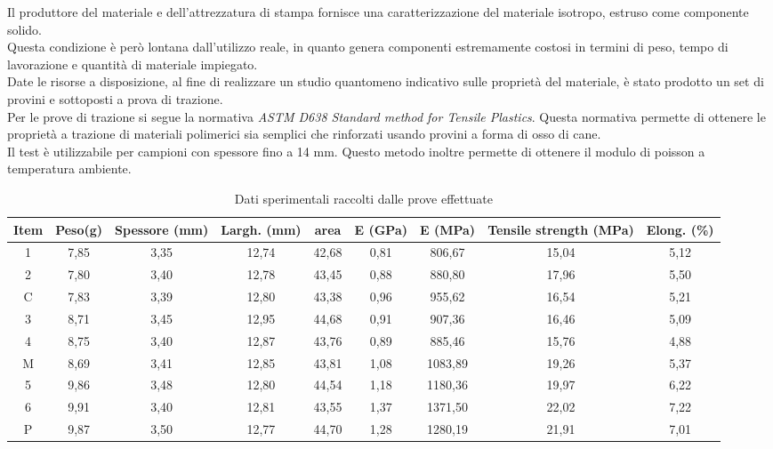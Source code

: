 \documentclass[%
corpo=11pt,
twoside,
 stile=classica,
oldstyle,
greek,%
]{toptesi}
\begin{document}
	
	Il produttore del materiale e dell'attrezzatura di stampa fornisce una caratterizzazione del materiale isotropo, estruso come componente solido.\\
	 Questa condizione è però lontana dall'utilizzo reale, in quanto genera componenti estremamente costosi in termini di peso, tempo di lavorazione e quantità di materiale impiegato. \\
	Date le risorse a disposizione, al fine di realizzare un studio quantomeno indicativo sulle proprietà del materiale, è stato prodotto un set di provini e sottoposti a prova di trazione.\\
	Per le prove di trazione si segue la normativa \textit{ASTM D638 Standard method for Tensile Plastics}. Questa normativa permette di ottenere le proprietà a trazione di materiali polimerici sia semplici che rinforzati usando provini a forma di osso di cane. \\
	Il test è utilizzabile per campioni con spessore fino a 14 mm. Questo metodo inoltre permette di ottenere il modulo di poisson a temperatura ambiente. 
\begin{table}[htbp]
	\centering
	\caption{Dati sperimentali raccolti dalle prove effettuate}
	\begin{tabular}{|p{3.5em}|c|c|c|c|c|c|c|c|}
		\hline
		Item & \multicolumn{1}{p{3.5em}|}{Peso(g)} & \multicolumn{1}{p{3.5em}|}{Spessore (mm)} & \multicolumn{1}{p{3.5em}|}{Largh. (mm)} & \multicolumn{1}{p{3.5em}|}{area} & \multicolumn{1}{p{3.5em}|}{E (GPa)} & \multicolumn{1}{p{3.5em}|}{E (MPa)} & \multicolumn{1}{p{3.5em}|}{Tensile strength (MPa)} & \multicolumn{1}{p{3.5em}|}{Elong. (\%)} \bigstrut\\
		\hline
		\multicolumn{1}{|c|}{1} & 7,85  & 3,35  & 12,74 & 42,68 & 0,81  & 806,67 & 15,04 & 5,12 \bigstrut\\
		\hline
		\multicolumn{1}{|c|}{2} & 7,80  & 3,40  & 12,78 & 43,45 & 0,88  & 880,80 & 17,96 & 5,50 \bigstrut\\
		\hline
		\multicolumn{1}{|c|}{C}    & 7,83  & 3,39  & 12,80 & 43,38 & 0,96  & 955,62 & 16,54 & 5,21 \bigstrut\\
		\hline
		\multicolumn{1}{|c|}{3} & 8,71  & 3,45  & 12,95 & 44,68 & 0,91  & 907,36 & 16,46 & 5,09 \bigstrut\\
		\hline
		\multicolumn{1}{|c|}{4} & 8,75  & 3,40  & 12,87 & 43,76 & 0,89  & 885,46 & 15,76 & 4,88 \bigstrut\\
		\hline
		\multicolumn{1}{|c|}{M}     & 8,69  & 3,41  & 12,85 & 43,81 & 1,08  & 1083,89 & 19,26 & 5,37 \bigstrut\\
		\hline
		\multicolumn{1}{|c|}{5} & 9,86  & 3,48  & 12,80 & 44,54 & 1,18  & 1180,36 & 19,97 & 6,22 \bigstrut\\
		\hline
		\multicolumn{1}{|c|}{6} & 9,91  & 3,40  & 12,81 & 43,55 & 1,37  & 1371,50 & 22,02 & 7,22 \bigstrut\\
		\hline
		\multicolumn{1}{|c|}{P}     & 9,87  & 3,50  & 12,77 & 44,70 & 1,28  & 1280,19 & 21,91 & 7,01 \bigstrut\\
		\hline
	\end{tabular}%
	\label{tab:testdata}%
\end{table}%
\end{document}
